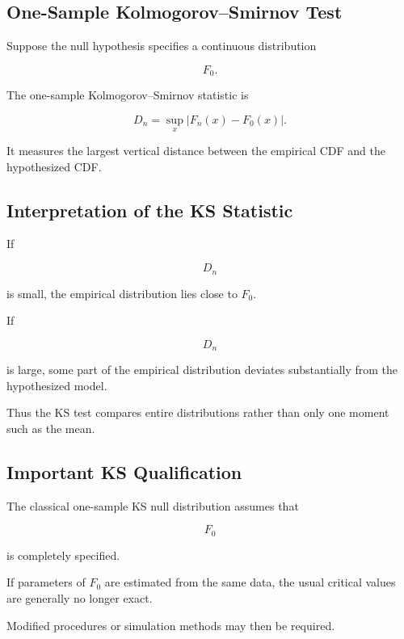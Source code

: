 \subsection{One-Sample Kolmogorov--Smirnov Test}
\label{subsec:one-sample-ks}

Suppose the null hypothesis specifies a continuous distribution

\[
F_0.
\]

The one-sample Kolmogorov--Smirnov statistic is

\[
\boxed{
D_n
=
\sup_x
|F_n(x)-F_0(x)|.
}
\]

It measures the largest vertical distance between the empirical CDF and
the hypothesized CDF.

\subsection{Interpretation of the KS Statistic}
\label{subsec:ks-interpretation}

If

\[
D_n
\]

is small, the empirical distribution lies close to \(F_0\).

If

\[
D_n
\]

is large, some part of the empirical distribution deviates substantially
from the hypothesized model.

Thus the KS test compares entire distributions rather than only one
moment such as the mean.

\subsection{Important KS Qualification}
\label{subsec:ks-parameter-estimation-qualification}

The classical one-sample KS null distribution assumes that

\[
F_0
\]

is completely specified.

If parameters of \(F_0\) are estimated from the same data, the usual
critical values are generally no longer exact.

Modified procedures or simulation methods may then be required.

